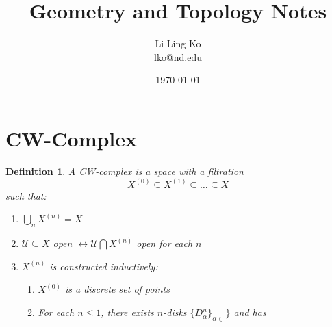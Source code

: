 \documentclass{article}
\begin{document}
\newtheorem{thm}{Theorem}[section]
\newtheorem{mydef}{Definition}[section]
\newtheorem{eg}{Example}[section]
\newtheorem{rmk}{Remark}[section]

\title{Geometry and Topology Notes}
\author{Li Ling Ko\\ lko@nd.edu}
\date{\today}
\maketitle

\section{CW-Complex}
\begin{mydef}
  A \textit{CW-complex} is a space with a filtration
  \begin{equation*}
    X^{(0)}\subseteq X^{(1)}\subseteq \ldots \subseteq X
  \end{equation*}
  such that:

  \begin{enumerate}[label=(\alph*)]
    \item $\bigcup\limits_n X^{(n)}=X$
    \item $\mathcal{U}\subseteq X$ open $\leftrightarrow\mathcal{U}\bigcap
      X^{(n)}$ open for each $n$
    \item $X^{(n)}$ is constructed inductively:
      \begin{enumerate}[label=(\roman*)]
        \item $X^{(0)}$ is a discrete set of points
        \item For each $n\leq1$, there exists $n$-disks
          $\{D^n_\alpha\}_{\alpha\in}\}$ and has
      \end{enumerate}
  \end{enumerate}
\end{mydef}
\end{document}
